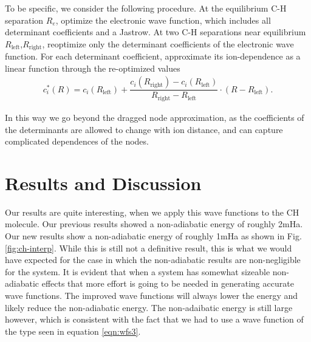 \documentclass[aip,jcp,numerical,reprint]{revtex4-1}
\begin{document}
To be specific, we consider the following procedure. At the equilibrium C-H separation $R_e$, optimize the electronic wave function, which includes all determinant coefficients and a Jastrow. At two C-H separations near equilibrium $R_{\text{left}}$,$R_{\text{right}}$, reoptimize only the determinant coefficients of the electronic wave function. For each determinant coefficient, approximate its ion-dependence as a linear function through the re-optimized values
\begin{align}
c_i^*(R) = c_i(R_{\text{left}}) + 
\dfrac{c_i(R_{\text{right}}) - c_i(R_{\text{left}})}{R_{\text{right}}-R_{\text{left}}}\cdot(R-R_{\text{left}}).
\end{align}

In this way we go beyond the dragged node approximation, as the coefficients of the determinants are allowed to change with ion distance, and can capture complicated dependences of the nodes. 


\section{Results and Discussion}

Our results are quite interesting, when we apply this wave functions to the CH molecule.  Our previous results showed a non-adiabatic energy of roughly 2mHa. Our new results show a non-adiabatic energy of roughly 1mHa as shown in Fig.\ref{fig:ch-interp}.  While this is still not a definitive result, this is what we would have expected for the case in which the non-adiabatic results are non-negligible for the system.  It is evident that when a system has somewhat sizeable non-adiabatic effects that more effort is going to be needed in generating accurate wave functions.  The improved wave functions will always lower the energy and likely reduce the non-adiabatic energy.  The non-adaibatic energy is still large however, which is consistent with the fact that we had to use a wave function of the type seen in equation \eqref{eqn:wfs3}.
\end{document}

